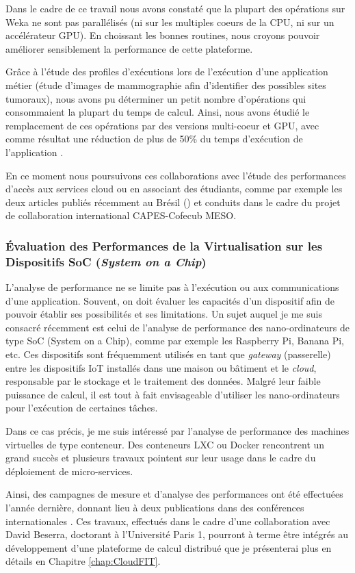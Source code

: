 Dans le cadre de ce travail nous avons constaté que la plupart des opérations sur Weka ne sont pas parallélisés (ni sur les multiples c{oe}urs de la CPU, ni sur un accélérateur GPU). En choissant les bonnes routines, nous croyons pouvoir améliorer sensiblement la performance de cette plateforme.

Grâce à l'étude des profiles d'exécutions lors de l'exécution d'une application métier (étude d'images de mammographie afin d'identifier des possibles sites tumoraux), nous avons pu déterminer un petit nombre d'opérations qui consommaient la plupart du temps de calcul. Ainsi, nous avons étudié le remplacement de ces opérations par des versions multi-c{oe}ur et GPU, avec comme résultat une réduction de plus de 50\% du temps d'exécution de l'application \cite{Engel14a,Engel2015}.

En ce moment nous poursuivons ces collaborations avec l'étude des performances d'accès aux services cloud \cite{Charao17a}  ou en associant des étudiants, comme par exemple les deux articles publiés récemment au Brésil (\cite{Nesi17a, Muenchen17a}) et conduits dans le cadre du projet de collaboration international CAPES-Cofecub MESO.

\subsubsection*{Évaluation des Performances de la Virtualisation sur les Dispositifs SoC (\textit{System on a Chip})}

 L'analyse de performance ne se limite pas à l'exécution ou aux communications d'une application. Souvent, on doit évaluer les capacités d'un dispositif afin de pouvoir établir ses possibilités et ses limitations. Un sujet auquel je me suis consacré récemment est celui de l'analyse de performance des nano-ordinateurs de type SoC (System on a Chip), comme par exemple les Raspberry Pi, Banana Pi, etc. Ces dispositifs sont fréquemment utilisés en tant que \textit{gateway} (passerelle) entre les dispositifs IoT installés dans une maison ou bâtiment et le \textit{cloud}, responsable par le stockage et le traitement des données. Malgré leur faible puissance de calcul, il est tout à fait envisageable d'utiliser les nano-ordinateurs pour l'exécution de certaines tâches.
 
 Dans ce cas précis, je me suis intéressé par l'analyse de performance des machines virtuelles de type conteneur. Des conteneurs LXC ou Docker rencontrent un grand succès et plusieurs travaux pointent sur leur usage dans le cadre du déploiement de micro-services.

Ainsi, des campagnes de mesure et d'analyse des performances ont été effectuées l'année dernière, donnant lieu à deux publications dans des conférences internationales \cite{Beserra17a, Beserra17b}. Ces travaux, effectués dans le cadre d'une collaboration avec David Beserra, doctorant à l'Université Paris 1, pourront à terme être intégrés au développement d'une plateforme de calcul distribué que je présenterai plus en détails en Chapitre \ref{chap:CloudFIT}.